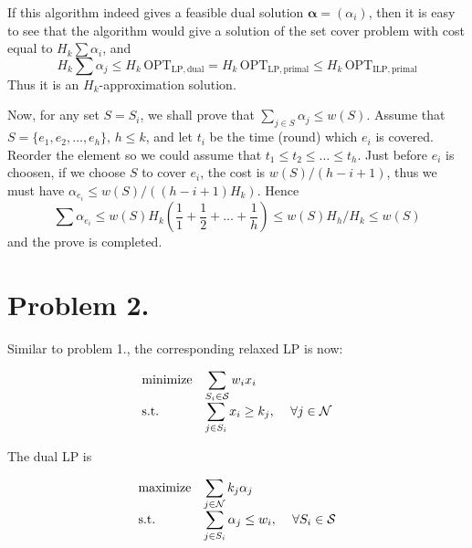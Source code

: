 \documentclass[12pt, a4paper]{article}
\begin{document}
If this algorithm indeed gives a feasible dual solution $\bm{\alpha} = (\alpha_i)$,
then it is easy to see that the algorithm would give a solution of the set cover problem
with cost equal to $H_k \sum \alpha_i$, and
\[ H_k \sum \alpha_j \leq H_k \,\mathrm{OPT}_\mathrm{LP,dual} = H_k \,\mathrm{OPT}_\mathrm{LP,primal}
  \leq H_k \,\mathrm{OPT}_\mathrm{ILP,primal} \]
Thus it is an $H_k$-approximation solution.

Now, for any set $S = S_i$, we shall prove that $\sum_{j \in S} \alpha_j \leq w(S)$.
Assume that $S = \{e_1, e_2, \dots, e_h\}, \, h \leq k$, and let $t_i$ be the time (round)
which $e_i$ is covered. Reorder the element so we could assume that $t_1 \leq t_2 \leq \dots \leq t_h$.
Just before $e_i$ is choosen, if we choose $S$ to cover $e_i$, the cost is $w(S) / (h-i+1)$,
thus we must have $\alpha_{e_i} \leq w(S)/((h-i+1)H_k)$.
Hence
\[ \sum \alpha_{e_i} \leq w(S) H_k \left( \frac{1}{1} + \frac{1}{2} + \dots + \frac{1}{h} \right)
  \leq w(S) H_h / H_k \leq w(S) \]
and the prove is completed.

\section{Problem 2.}

Similar to problem 1., the corresponding relaxed LP is now:

\begin{equation} \label{eq:set-cover2-lp}
  \begin{array}{>{\displaystyle}l>{\displaystyle}r>{\displaystyle}l}
    \text{minimize} & \multicolumn{1}{l}{\displaystyle \sum_{S_i \in \mathcal{S}} w_i x_i} \\[10pt]
    \text{s.t.} & \sum_{j \in S_i} x_i \geq k_j, & \ \forall j \in \mathcal{N} \\
  \end{array}
\end{equation}

The dual LP is

\begin{equation} \label{eq:set-cover2-dual-lp}
  \begin{array}{>{\displaystyle}l>{\displaystyle}r>{\displaystyle}l}
    \text{maximize} & \multicolumn{1}{l}{\displaystyle \sum_{j \in \mathcal{N}} k_j \alpha_j} \\[10pt]
    \text{s.t.} & \sum_{j \in S_i} \alpha_j \leq w_i, & \ \forall S_i \in \mathcal{S} \\
  \end{array}
\end{equation}
\end{document}
